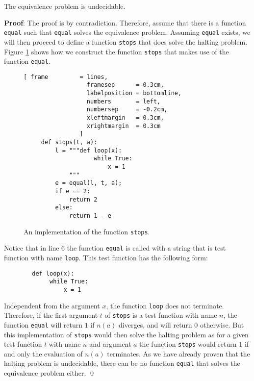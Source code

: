 \begin{Theorem}
\hspace*{\fill} \linebreak
The equivalence problem is undecidable.  
\end{Theorem}

\noindent
\textbf{Proof}:
The proof is by contradiction.  Therefore, assume that there is a function \texttt{equal}
such that \texttt{equal} solves the equivalence problem.  Assuming \texttt{equal} exists, we will
then proceed to define a function \texttt{stops} that does solve the halting problem.
Figure \ref{fig:stops} shows how we construct the function \texttt{stops} that makes use 
of the function \texttt{equal}.


\begin{figure}[!h]
  \centering
\begin{Verbatim}[ frame         = lines, 
                  framesep      = 0.3cm, 
                  labelposition = bottomline,
                  numbers       = left,
                  numbersep     = -0.2cm,
                  xleftmargin   = 0.3cm,
                  xrightmargin  = 0.3cm
                ]
     def stops(t, a):
         l = """def loop(x): 
                    while True:
                        x = 1
             """ 
         e = equal(l, t, a);
         if e == 2:
             return 2
         else:
             return 1 - e
\end{Verbatim}
  \vspace*{-0.3cm}
  \caption{An implementation of the function \texttt{stops}.}
  \label{fig:stops}
\end{figure}

Notice that in line 6 the function \texttt{equal} is called with a string that is test function with
name \texttt{loop}.  This test function has the following form:
\begin{verbatim}
        def loop(x): 
             while True:
                 x = 1
\end{verbatim}
Independent from the argument $x$, the function \texttt{loop} does not terminate.
Therefore, if the first argument $t$ of \texttt{stops} is a test function with name $n$, 
the function \texttt{equal} will return $1$ if $n(a)$ diverges, and will return $0$ otherwise.
But this implementation of \texttt{stops} would then solve the halting problem as
for a given test function $t$ with name $n$ and argument $a$ the function \texttt{stops} would
return 1 if and only the evaluation of $n(a)$ terminates.  As we have already proven that the
halting problem is undecidable, there can be no function \texttt{equal} that solves the equivalence
problem either.
\qed

